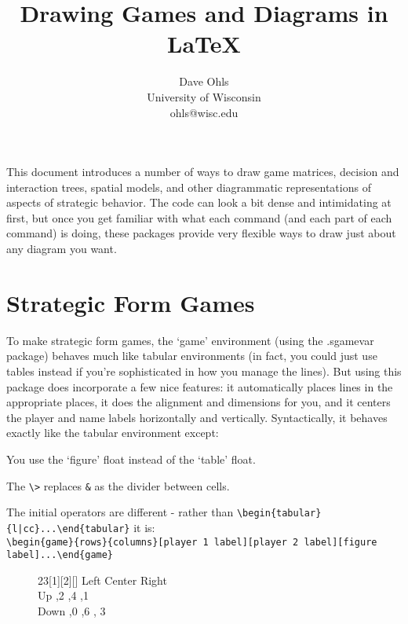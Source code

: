 \documentclass{article}
\title{Drawing Games and Diagrams in \LaTeX}
\author{Dave Ohls \\ University of Wisconsin \\ ohls@wisc.edu}
\date{}
\begin{document}
\maketitle

This document introduces a number of ways to draw game matrices, decision and interaction trees, spatial models, and other diagrammatic representations of aspects of strategic behavior.  The code can look a bit dense and intimidating at first, but once you get familiar with what each command (and each part of each command) is doing, these packages provide very flexible ways to draw just about any diagram you want. \\

\newpage


\section{Strategic Form Games}

To make strategic form games, the `game' environment (using the .sgamevar package) behaves much like tabular environments (in fact, you could just use tables instead if you're sophisticated in how you manage the lines).  But using this package does incorporate a few nice features: it automatically places lines in the appropriate places, it does the alignment and dimensions for you, and it centers the player and name labels horizontally and vertically.  Syntactically, it behaves exactly like the tabular environment except:\\

\begin{compactitem}
\item You use the `figure' float instead of the `table' float.
\item The \verb+\>+ replaces \verb+&+ as the divider between cells. %
\item The initial operators are different - rather than \verb+\begin{tabular}{l|cc}...\end{tabular}+ it is: \\ \verb+\begin{game}{rows}{columns}[player 1 label][player 2 label][figure label]...\end{game}+ \\
\end{compactitem}


\begin{figure}[h!]
\begin{center}
\begin{footnotesize}
\begin{game}{2}{3}[1][2][]
        \> Left \> Center \> Right   \\
Up      ,2  ,4    ,1   \\
Down    ,0  ,6    , 3 \\
\end{game}
\end{footnotesize}
\end{center}
\end{figure}
\end{document}
